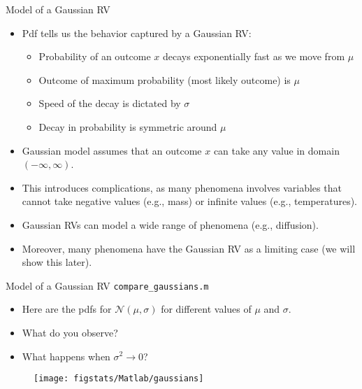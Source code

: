 \documentclass[9pt]{beamer}
\begin{document}
%
\begin{frame}{Model of a Gaussian RV}


\begin{itemize}
\setlength{\itemsep}{10pt}
\item Pdf tells us the behavior captured by a Gaussian RV: 

\begin{itemize}
\setlength{\itemsep}{5pt}
\item Probability of an outcome $x$ decays exponentially fast as we move from $\mu$
\item Outcome of maximum probability (most likely outcome) is $\mu$
\item Speed of the decay is dictated by $\sigma$
\item Decay in probability is symmetric around $\mu$
\end{itemize}

\item Gaussian model assumes that an outcome $x$ can take any value in domain $(-\infty,\infty)$. 

\item This introduces complications, as many phenomena involves variables that cannot take negative values (e.g., mass) or infinite values (e.g., temperatures).   

\item Gaussian RVs can model a wide range of phenomena (e.g., diffusion). 

\item Moreover, many phenomena have the Gaussian RV as a limiting case (we will show this later). 
\end{itemize}

\end{frame}

%
\begin{frame}{Model of a Gaussian RV \footnotesize{\texttt{compare\_gaussians.m}}}
\begin{itemize}
\setlength{\itemsep}{10pt}
\item Here are the pdfs for $\mathcal{N}(\mu,\sigma)$ for different values of $\mu$ and $\sigma$.
\item What do you observe?
\item What happens when $\sigma^2\to 0$?
\end{itemize}
\begin{figure}[!htb]
    \centering
	\texttt{[image: figstats/Matlab/gaussians]}
\end{figure}
\end{frame}
\end{document}
